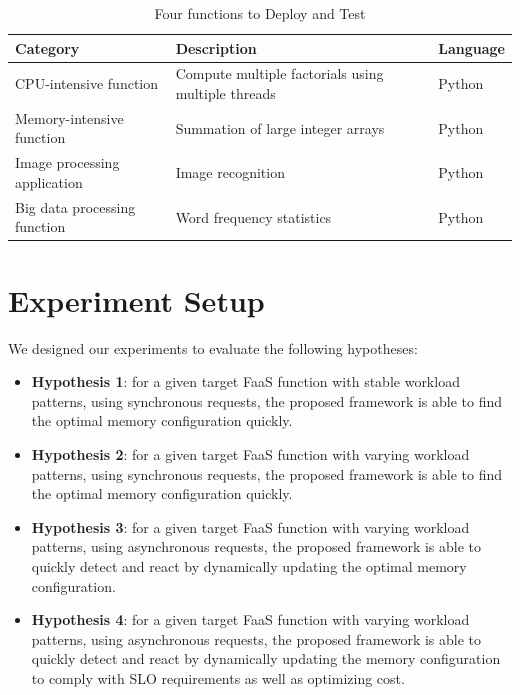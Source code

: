 \documentclass[conference]{IEEEtran}
\begin{document}
\begin{table}
\centering

\begin{tabular}{| p{1in} | p{1in} | p{0.75in} |}
\hline
Category & Description & Language \\
\hline

\hline
CPU-intensive function & Compute multiple factorials using multiple threads& Python \\
\hline
Memory-intensive function & Summation of large integer arrays & Python\\
\hline
Image processing application & Image recognition & Python\\
\hline
Big data processing function & Word frequency statistics & Python \\
\hline

\end{tabular}
\caption{Four functions to Deploy and Test}
\label{table: 1}
\end{table}

\section{Experiment Setup}

We designed our experiments to evaluate the following hypotheses:

\begin{itemize}
    \item \textbf{Hypothesis 1}: for a given target FaaS function with stable workload patterns, using synchronous requests, the proposed framework is able to find the optimal memory configuration quickly.

    \item \textbf{Hypothesis 2}: for a given target FaaS function with varying workload patterns, using synchronous requests, the proposed framework is able to find the optimal memory configuration quickly.
    
    \item \textbf{Hypothesis 3}: for a given target FaaS function with varying workload patterns, using asynchronous requests, the proposed framework is able to quickly detect and react by dynamically updating the optimal memory configuration.

    \item \textbf{Hypothesis 4}: for a given target FaaS function with varying workload patterns, using asynchronous requests, the proposed framework is able to quickly detect and react by dynamically updating the memory configuration to comply with SLO requirements as well as optimizing cost.

\end{itemize}
\end{document}
